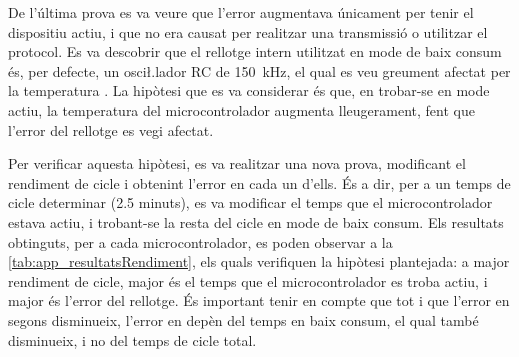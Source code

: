 \documentclass{tfgitic}[2024/07/01]
\begin{document}
{De l'última prova es va veure que l'error augmentava únicament per tenir el dispositiu actiu, i que no era causat per realitzar una transmissió o utilitzar el protocol. Es va descobrir que el rellotge intern utilitzat en mode de baix consum és, per defecte, un osci\l.lador RC de \SI{150}{\kilo\hertz}, el qual es veu greument afectat per la temperatura \cite{espressif_system_nodate}. La hipòtesi que es va considerar és que, en trobar-se en mode actiu, la temperatura del microcontrolador augmenta lleugerament, fent que l'error del rellotge es vegi afectat.

Per verificar aquesta hipòtesi, es va realitzar una nova prova, modificant el rendiment de cicle i obtenint l'error en cada un d'ells. És a dir, per a un temps de cicle determinar (2.5 minuts), es va modificar el temps que el microcontrolador estava actiu, i trobant-se la resta del cicle en mode de baix consum. Els resultats obtinguts, per a cada microcontrolador, es poden observar a la \autoref{tab:app_resultatsRendiment}, els quals verifiquen la hipòtesi plantejada: a major rendiment de cicle, major és el temps que el microcontrolador es troba actiu, i major és l'error del rellotge. És important tenir en compte que tot i que l'error en segons disminueix, l'error en  depèn del temps en baix consum, el qual també disminueix, i no del temps de cicle total.

}
\end{document}
